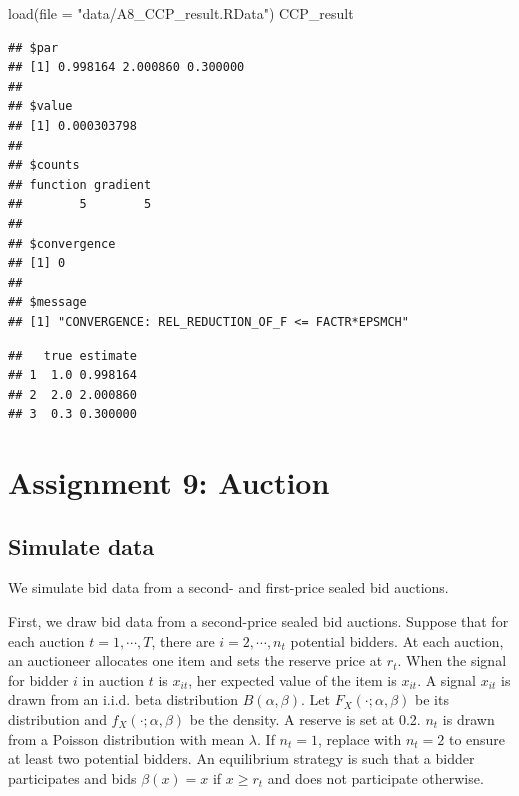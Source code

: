 \documentclass[
]{book}
\newenvironment{Shaded}{\begin{snugshade}}{\end{snugshade}}
\newcommand{\AttributeTok}[1]{\textcolor[rgb]{0.77,0.63,0.00}{#1}}
\newcommand{\FunctionTok}[1]{\textcolor[rgb]{0.00,0.00,0.00}{#1}}
\newcommand{\NormalTok}[1]{#1}
\newcommand{\OtherTok}[1]{\textcolor[rgb]{0.56,0.35,0.01}{#1}}
\newcommand{\SpecialCharTok}[1]{\textcolor[rgb]{0.00,0.00,0.00}{#1}}
\newcommand{\StringTok}[1]{\textcolor[rgb]{0.31,0.60,0.02}{#1}}
\begin{document}
\begin{Shaded}
\begin{Highlighting}[]
\FunctionTok{load}\NormalTok{(}\AttributeTok{file =} \StringTok{"data/A8\_CCP\_result.RData"}\NormalTok{)}
\NormalTok{CCP\_result}
\end{Highlighting}
\end{Shaded}

\begin{verbatim}
## $par
## [1] 0.998164 2.000860 0.300000
## 
## $value
## [1] 0.000303798
## 
## $counts
## function gradient 
##        5        5 
## 
## $convergence
## [1] 0
## 
## $message
## [1] "CONVERGENCE: REL_REDUCTION_OF_F <= FACTR*EPSMCH"
\end{verbatim}

\begin{Shaded}
\end{Shaded}

\begin{verbatim}
##   true estimate
## 1  1.0 0.998164
## 2  2.0 2.000860
## 3  0.3 0.300000
\end{verbatim}

\hypertarget{assignment9}{%
\chapter{Assignment 9: Auction}\label{assignment9}}

\hypertarget{simulate-data-8}{%
\section{Simulate data}\label{simulate-data-8}}

We simulate bid data from a second- and first-price sealed bid auctions.

First, we draw bid data from a second-price sealed bid auctions. Suppose that for each auction \(t = 1, \cdots, T\), there are \(i = 2, \cdots, n_t\) potential bidders. At each auction, an auctioneer allocates one item and sets the reserve price at \(r_t\). When the signal for bidder \(i\) in auction \(t\) is \(x_{it}\), her expected value of the item is \(x_{it}\). A signal \(x_{it}\) is drawn from an i.i.d. beta distribution \(B(\alpha, \beta)\). Let \(F_X(\cdot; \alpha, \beta)\) be its distribution and \(f_X(\cdot; \alpha, \beta)\) be the density. A reserve is set at 0.2. \(n_t\) is drawn from a Poisson distribution with mean \(\lambda\). If \(n_t = 1\), replace with \(n_t = 2\) to ensure at least two potential bidders. An equilibrium strategy is such that a bidder participates and bids \(\beta(x) = x\) if \(x \ge r_t\) and does not participate otherwise.
\end{document}
